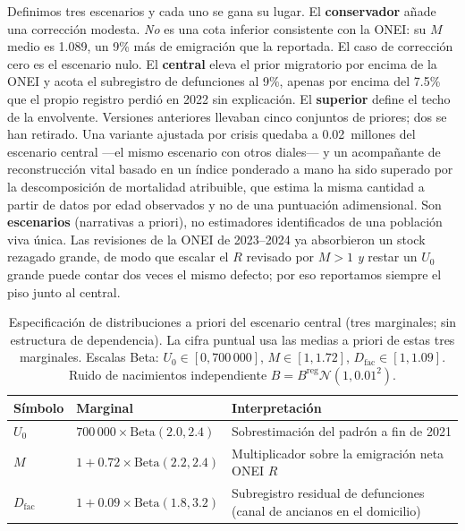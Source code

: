 \documentclass[11pt,a4paper]{article}
\begin{document}
Definimos tres escenarios y cada uno se gana su lugar.
El \textbf{conservador} añade una corrección modesta. \emph{No} es una cota inferior consistente con la ONEI: su $M$ medio es 1.089, un 9\% más de emigración que la reportada. El caso de corrección cero es el escenario nulo.
El \textbf{central} eleva el prior migratorio por encima de la ONEI y acota el subregistro de defunciones al 9\%, apenas por encima del 7.5\% que el propio registro perdió en 2022 sin explicación.
El \textbf{superior} define el techo de la envolvente.
Versiones anteriores llevaban cinco conjuntos de priores; dos se han retirado.
Una variante ajustada por crisis quedaba a 0.02~millones del escenario central ---el mismo escenario con otros diales--- y un acompañante de reconstrucción vital basado en un índice ponderado a mano ha sido superado por la descomposición de mortalidad atribuible, que estima la misma cantidad a partir de datos por edad observados y no de una puntuación adimensional.
Son \textbf{escenarios} (narrativas a priori), no estimadores identificados de una población viva única.
Las revisiones de la ONEI de 2023--2024 ya absorbieron un stock rezagado grande, de modo que escalar el $R$ revisado por $M>1$ \emph{y} restar un $U_0$ grande puede contar dos veces el mismo defecto; por eso reportamos siempre el piso junto al central.

\begin{table}[ht]
\centering
\caption{Especificación de distribuciones a priori del escenario central (tres marginales; sin estructura de dependencia).
La cifra puntual usa las medias a priori de estas tres marginales.
Escalas Beta: $U_0\in[0,700\,000]$, $M\in[1,1.72]$, $D_{\mathrm{fac}}\in[1,1.09]$.
Ruido de nacimientos independiente $B=B^{\mathrm{reg}}\mathcal{N}(1,0.01^2)$.}
\label{tab:priors}
\begin{tabular}{llp{6.2cm}}
\toprule
Símbolo & Marginal & Interpretación \\
\midrule
$U_0$ & $700\,000\times\mathrm{Beta}(2.0,2.4)$ & Sobrestimación del padrón a fin de 2021 \\
$M$ & $1+0.72\times\mathrm{Beta}(2.2,2.4)$ & Multiplicador sobre la emigración neta ONEI $R$ \\
$D_{\mathrm{fac}}$ & $1+0.09\times\mathrm{Beta}(1.8,3.2)$ & Subregistro residual de defunciones (canal de ancianos en el domicilio) \\
\bottomrule
\end{tabular}
\end{table}
\end{document}
